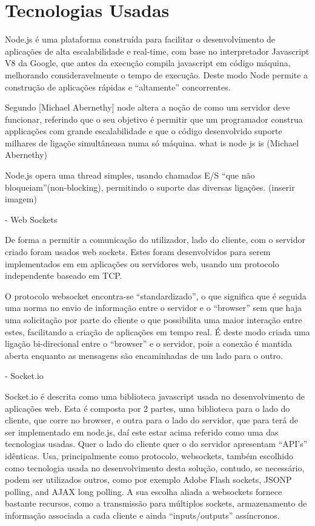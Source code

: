 \section{Tecnologias Usadas} \label{sec:tec}

Node.js é uma plataforma construída para facilitar o desenvolvimento de aplicações de alta escalabilidade e real-time, com base no interpretador Javascript V8 da Google, que antes da execução compila javascript em código máquina, melhorando consideravelmente o tempo de execução. Deste modo Node permite a construção de aplicações rápidas e “altamente” concorrentes.

Segundo [Michael Abernethy] node altera a noção de como um servidor deve funcionar, referindo que o seu objetivo é permitir que um programador construa applicações com grande escalabilidade e que o código desenvolvido suporte milhares de ligaçõe simultâneasa numa só máquina. what is node js is (Michael Abernethy)

Node.js opera uma thread simples, usando chamadas E/S “que não bloqueiam”(non-blocking), permitindo o suporte das diversas ligações. (inserir imagem)


- Web Sockets

De forma a permitir a comunicação do utilizador, lado do cliente, com o servidor criado foram usados web sockets. Estes foram desenvolvidos para serem implementados em em aplicações ou servidores web, usando um protocolo independente baseado em TCP.

O protocolo websocket encontra-se “standardizado”, o que significa que é seguida uma norma no envio de informação entre o servidor e o “browser” sem que haja uma solicitação por parte do cliente o que possibilita uma maior interação entre estes, facilitando a criação de aplicações em tempo real. É deste modo criada uma ligação bi-direcional entre o “browser” e o servidor, pois a conexão é mantida aberta enquanto as mensagens são encaminhadas de um lado para o outro.


- Socket.io

Socket.io é descrita como uma biblioteca javascript usada no desenvolvimento de aplicações web. Esta é composta por 2 partes, uma biblioteca para o lado do cliente, que corre no browser, e outra para o lado do servidor, que para terá de ser implementado em node.js, daí este estar acima referido como uma das tecnologias usadas. Quer o lado do cliente quer o do servidor apresentam “API’s” idênticas. 
Usa, principalmente como protocolo, websockets, também escolhido como tecnologia usada no desenvolvimento desta solução, contudo, se necessário, podem ser utilizados outros, como por exemplo Adobe Flash sockets, JSONP polling, and AJAX long polling. 
A sua escolha aliada a websockets fornece bastante recursos, como a transmissão para múltiplos sockets, armazenamento de informação associada a cada cliente e ainda “inputs/outputs” assíncronos. 

